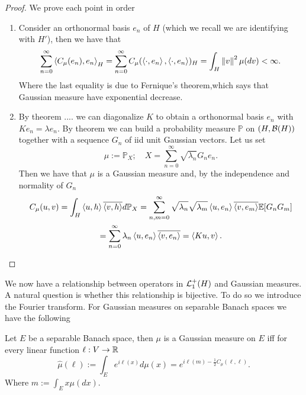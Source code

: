 \documentclass[
    a4paper,
    DIV=14,
    abstract=true,
    numbers=noenddot
]{scrartcl}
\begin{document}
\begin{proof} We prove each point in order

	\begin{enumerate}        \item Consider an orthonormal basis $e_n$ of $H$ (which we recall we are identifying with $H'$), then we have that
		      \begin{equation*}
			      \sum_{n=0}^{\infty} \left\langle C_\mu (e_n),e_n\right\rangle_H=\sum_{n=0}^{\infty} C_\mu (\left\langle\cdot ,e_n\right\rangle,\left\langle\cdot ,e_n\right\rangle)_H=\int_{H}\left\lVert v \right\rVert^2 \mu (dv)<\infty.
		      \end{equation*}
		      Where the last equality is due to Fernique's theorem,which says that Gaussian measure have exponential decrease.
		\item By theorem .... we can diagonalize $K$ to obtain a orthonormal basis  $e_n$ with  $Ke_n=\lambda e_n$. By theorem we can build a probability measure $\mathbb{P}$ on $(H,\mathcal{B}(H))$ together with a sequence $G_n$ of iid unit Gaussian vectors. Let us set
		      \begin{equation*}
			      \mu :=\mathbb{P}_X;\quad X=\sum_{n=0}^{\infty} \sqrt{\lambda _n} G_ne_n .
		      \end{equation*}
		      Then we have that $\mu $ is a Gaussian measure and, by the  independence and normality of $G_n$
		      \begin{multline*}
			      C_\mu (u,v)=\int_{H}\left\langle u,h\right\rangle\overline{\left\langle v,h\right\rangle} d\mathbb{P}_X=\sum_{n,m=0}^{\infty}\sqrt{\lambda_n}\sqrt{\lambda_m}  \left\langle u,e_n\right\rangle\overline{\left\langle v,e_m\right\rangle}\mathbb{E}[G_nG_m]\\
			      =\sum_{n=0}^{\infty}\lambda_n\left\langle u,e_n\right\rangle\overline{\left\langle v,e_n\right\rangle}=\left\langle Ku,v\right\rangle.
		      \end{multline*}

	\end{enumerate}
\end{proof}
We now have a relationship between operators in $\mathcal{L}_1^+(H)$ and Gaussian measures. A natural question is whether this relationship is bijective. To do so we introduce the Fourier transform. For Gaussian measures on separable Banach spaces we have the following
\begin{proposition}
	Let $E$ be a separable Banach space, then $\mu $ is a Gaussian measure on $E$ iff for every linear function  $\ell :V\to\mathbb{R}$
	\begin{equation*}
		\hat{\mu }(\ell ):=\int_{E} e^{i\ell (x)}d\mu(x)=e^{i\ell(m)-\frac{1}{2}C_\mu (\ell ,\ell )}.
	\end{equation*}
	Where
	$        m:=\int_{E}x \mu (dx).
	$
\end{proposition}
\end{document}
